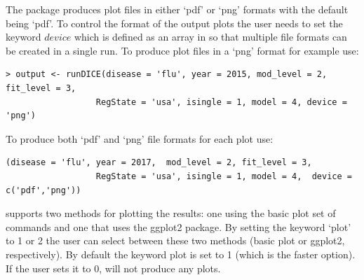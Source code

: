 \documentclass[a4paper]{article}
\begin{document}
The  package produces plot files in either `pdf' or `png' formats with the default being `pdf'. To control the format of the output plots the user needs to set the keyword $device$ which is defined as an array in  so that multiple file formats can be created in a single run.  To produce plot files in a `png' format for example use:
\begin{verbatim}
> output <- runDICE(disease = 'flu', year = 2015, mod_level = 2, fit_level = 3,
			      RegState = 'usa', isingle = 1, model = 4, device = 'png')
\end{verbatim}
To produce both `pdf' and `png'  file formats for each plot use:
\begin{verbatim}
(disease = 'flu', year = 2017,  mod_level = 2, fit_level = 3,
			      RegState = 'usa', isingle = 1, model = 4,  device = c('pdf','png'))
 \end{verbatim}

 supports two methods for plotting the results: one using the basic plot set of commands and one that uses the ggplot2 package.  By setting the keyword `plot' to 1 or 2 the user can select between these two methods (basic plot or ggplot2, respectively). By default the keyword plot is set to 1 (which is the faster option). If the user sets it to 0,  will not produce any plots.



\end{document}
